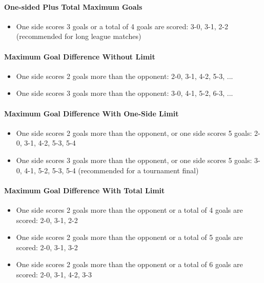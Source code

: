 \documentclass[12pt]{article}
\begin{document}
\paragraph{One-sided Plus Total Maximum Goals}

\begin{itemize}
\item One side scores 3 goals or a total of 4 goals are scored: 3-0, 3-1, 2-2 (recommended for long league matches)
\end{itemize}

\paragraph{Maximum Goal Difference Without Limit}

\begin{itemize}
\item One side scores 2 goals more than the opponent: 2-0, 3-1, 4-2, 5-3, ...
\item One side scores 3 goals more than the opponent: 3-0, 4-1, 5-2, 6-3, ...
\end{itemize}

\paragraph{Maximum Goal Difference With One-Side Limit}

\begin{itemize}
\item One side scores 2 goals more than the opponent, or one side scores 5 goals: 2-0, 3-1, 4-2, 5-3, 5-4
\item One side scores 3 goals more than the opponent, or one side scores 5 goals: 3-0, 4-1, 5-2, 5-3, 5-4 (recommended for a tournament final)
\end{itemize}

\paragraph{Maximum Goal Difference With Total Limit}

\begin{itemize}
\item One side scores 2 goals more than the opponent or a total of 4 goals are scored: 2-0, 3-1, 2-2
\item One side scores 2 goals more than the opponent or a total of 5 goals are scored: 2-0, 3-1, 3-2
\item One side scores 2 goals more than the opponent or a total of 6 goals are scored: 2-0, 3-1, 4-2, 3-3
\end{itemize}
\end{document}
